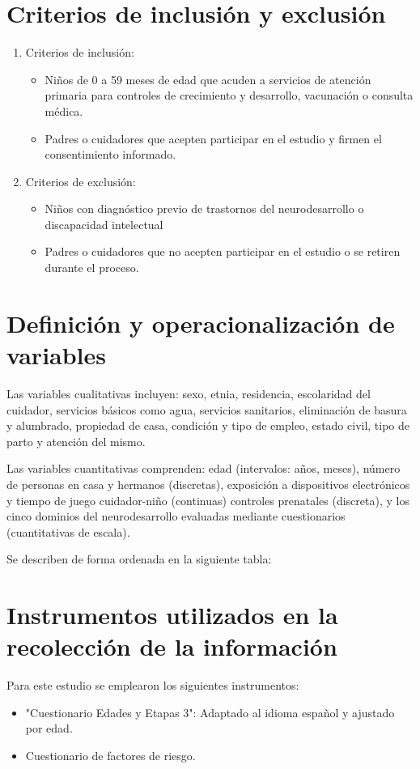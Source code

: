 \documentclass[11pt,letterpaper]{report}
\newcommand{\asq}{"Cuestionario Edades y Etapas 3"}
\begin{document}
\section{Criterios de inclusión y exclusión}
	\begin{enumerate}
		\item Criterios de inclusión:
			\begin{itemize}
				\item Niños de 0 a 59 meses de edad que acuden a servicios de
				atención primaria para controles de crecimiento y desarrollo,
				vacunación o consulta médica.
				\item Padres o cuidadores que acepten participar en el estudio
				y firmen el consentimiento informado.
			\end{itemize}
		\item Criterios de exclusión:
			\begin{itemize}
				\item Niños con diagnóstico previo de trastornos del
				neurodesarrollo o discapacidad intelectual
				\item Padres o cuidadores que no acepten participar en el
				estudio o se retiren durante el proceso.
			\end{itemize}
	\end{enumerate}

\section{Definición y operacionalización de variables}
Las variables cualitativas incluyen: sexo, etnia, residencia, escolaridad del
cuidador, servicios básicos como agua, servicios sanitarios, eliminación de
basura y alumbrado, propiedad de casa, condición y tipo de empleo, estado civil,
tipo de parto y atención del mismo.

Las variables cuantitativas comprenden: edad (intervalos: años, meses), número
de personas en casa y hermanos (discretas), exposición a dispositivos
electrónicos y tiempo de juego cuidador-niño (continuas) controles prenatales
(discreta), y los cinco dominios del neurodesarrollo evaluadas mediante
cuestionarios (cuantitativas de escala).

Se describen de forma ordenada en la siguiente tabla:



\section{Instrumentos utilizados en la recolección de la información}
Para este estudio se emplearon los siguientes instrumentos:
		\begin{itemize}
		\item \asq: Adaptado al idioma español y ajustado por edad.	
		\item Cuestionario de factores de riesgo.
		\end{itemize}
\end{document}
